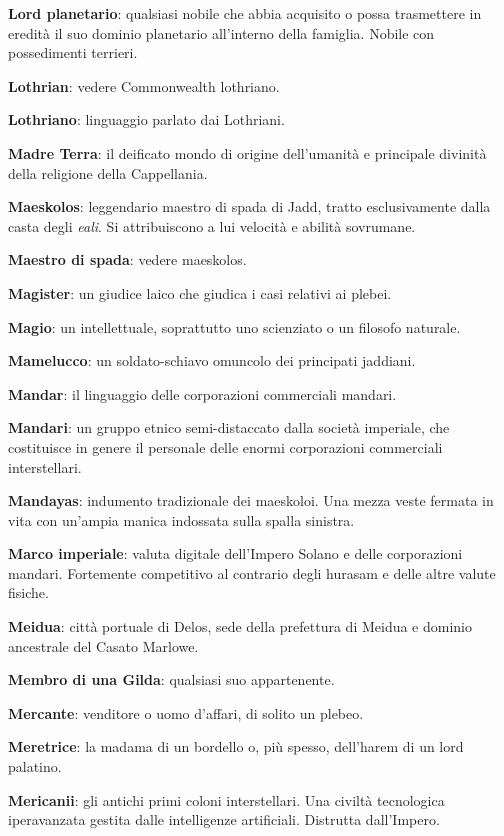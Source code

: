 \textbf{Lord planetario}: qualsiasi nobile che abbia acquisito o possa
trasmettere in eredità il suo dominio planetario all'interno della
famiglia. Nobile con possedimenti terrieri.

\textbf{Lothrian}: vedere Commonwealth lothriano.

\textbf{Lothriano}: linguaggio parlato dai Lothriani.

\textbf{Madre Terra}: il deificato mondo di origine dell'umanità e
principale divinità della religione della Cappellania.

\textbf{Maeskolos}: leggendario maestro di spada di Jadd, tratto
esclusivamente dalla casta degli \emph{eali}. Si attribuiscono a lui
velocità e abilità sovrumane.

\textbf{Maestro di spada}: vedere maeskolos.

\textbf{Magister}: un giudice laico che giudica i casi relativi ai
plebei.

\textbf{Magio}: un intellettuale, soprattutto uno scienziato o un
filosofo naturale.

\textbf{Mamelucco}: un soldato-schiavo omuncolo dei principati jaddiani.

\textbf{Mandar}: il linguaggio delle corporazioni commerciali mandari.

\textbf{Mandari}: un gruppo etnico semi-distaccato dalla società
imperiale, che costituisce in genere il personale delle enormi
corporazioni commerciali interstellari.

\textbf{Mandayas}: indumento tradizionale dei maeskoloi. Una mezza veste
fermata in vita con un'ampia manica indossata sulla spalla sinistra.

\textbf{Marco imperiale}: valuta digitale dell'Impero Solano e delle
corporazioni mandari. Fortemente competitivo al contrario degli hurasam
e delle altre valute fisiche.

\textbf{Meidua}: città portuale di Delos, sede della prefettura di
Meidua e dominio ancestrale del Casato Marlowe.

\textbf{Membro di una Gilda}: qualsiasi suo appartenente.

\textbf{Mercante}: venditore o uomo d'affari, di solito un plebeo.

\textbf{Meretrice}: la madama di un bordello o, più spesso, dell'harem
di un lord palatino.

\textbf{Mericanii}: gli antichi primi coloni interstellari. Una civiltà
tecnologica iperavanzata gestita dalle intelligenze artificiali.
Distrutta dall'Impero.

